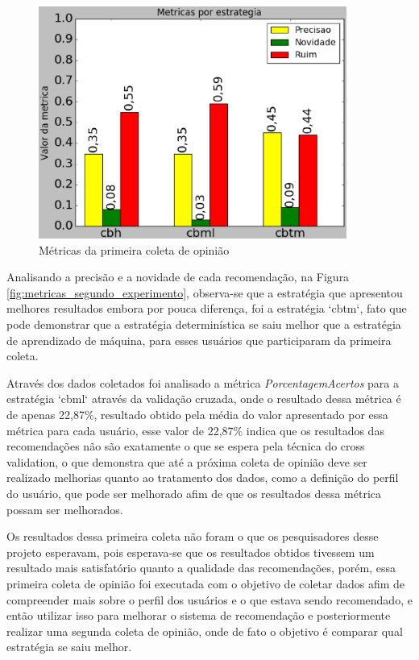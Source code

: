 \begin{figure}[h]
  \centering
  \includegraphics[width=0.9\textwidth]{figuras/metricas_primeiro_experimento.eps}
  \caption{Métricas da primeira coleta de opinião}
  \label{fig:metricas_primeiro_experimento}
\end{figure}

Analisando a precisão e a novidade de cada recomendação, na Figura
\ref{fig:metricas_segundo_experimento}, observa-se que a estratégia que
apresentou melhores resultados embora por pouca diferença, foi a estratégia
`cbtm`, fato que pode demonstrar que a estratégia determinística se saiu melhor
que a estratégia de aprendizado de máquina, para esses usuários que
participaram da primeira coleta.

Através dos dados coletados foi analisado a métrica \textit{PorcentagemAcertos}
para a estratégia `cbml` através da validação cruzada, onde o resultado dessa
métrica é de apenas 22,87\%, resultado obtido pela média do valor apresentado
por essa métrica para cada usuário, esse valor de 22,87\% indica que os
resultados das recomendações não são exatamente o que se espera pela técnica
do cross validation, o que demonstra que até a próxima coleta de opinião deve ser
realizado melhorias quanto ao tratamento dos dados, como a definição do perfil
do usuário, que pode ser melhorado afim de que os resultados dessa métrica
possam ser melhorados.

Os resultados dessa primeira coleta não foram o que os pesquisadores desse
projeto esperavam, pois esperava-se que os resultados obtidos tivessem um
resultado mais satisfatório quanto a qualidade das recomendações, porém, essa
primeira coleta de opinião foi executada com o objetivo de coletar dados afim de
compreender mais sobre o perfil dos usuários e o que estava sendo recomendado,
e então utilizar isso para melhorar o sistema de recomendação e posteriormente
realizar uma segunda coleta de opinião, onde de fato o objetivo é comparar qual
estratégia se saiu melhor.

